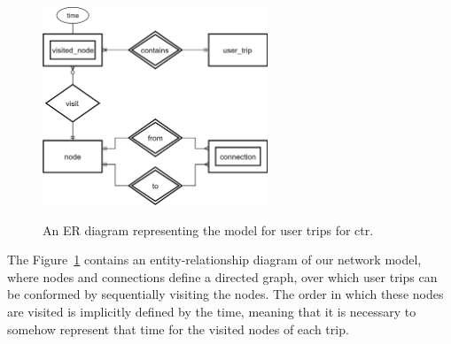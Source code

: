 	
	\begin{figure}[ht]
		\begin{center}
			{\includegraphics[width=0.6\textwidth]{figures/street_er.png}}
		\end{center}
		\caption{An ER diagram representing the model for user trips for \acrshort{ctr}.}
		\label{fig:street_er}
	\end{figure}
    
    The Figure~\ref{fig:street_er} contains an entity-relationship diagram of our network model, where nodes and connections define a directed graph, over which user trips can be conformed by sequentially visiting the nodes. The order in which these nodes are visited is implicitly defined by the time, meaning that it is necessary to somehow represent that time for the visited nodes of each trip.
	
